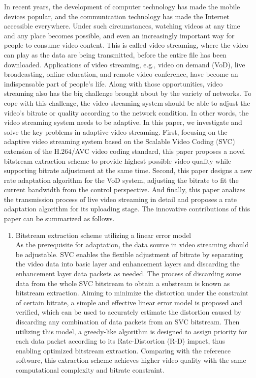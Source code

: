 \begin{eabstract}
In recent years, the development of computer technology has made the mobile devices popular, and the communication technology has made the Internet accessible everywhere. Under such circumstances, watching videos at any time and any place becomes possible, and even an increasingly important way for people to consume video content. This is called video streaming, where the video can play as the data are being transmitted, before the entire file has been downloaded. Applications of video streaming, e.g., video on demand (VoD), live broadcasting, online education, and remote video conference, have become an indispensable part of people's life. Along with those opportunities, video streaming also has the big challenge brought about by the variety of networks. To cope with this challenge, the video streaming system should be able to adjust the video's bitrate or quality according to the network condition. In other words, the video streaming system needs to be adaptive. In this paper, we investigate and solve the key problems in adaptive video streaming. First, focusing on the adaptive video streaming system based on the Scalable Video Coding (SVC) extension of the H.264/AVC video coding standard, this paper proposes a novel bitstream extraction scheme to provide highest possible video quality while supporting bitrate adjustment at the same time. Second, this paper designs a new rate adaptation algorithm for the VoD system, adjusting the bitrate to fit the current bandwidth from the control perspective. And finally, this paper analizes the transmission process of live video streaming in detail and proposes a rate adaptation algorithm for its uploading stage. The innovative contributions of this paper can be summarized as follows.
\begin{enumerate}
\item {Bitstream extraction scheme utilizing a linear error model}\\
As the prerequisite for adaptation, the data source in video streaming should be adjustable. SVC enables the flexible adjustment of bitrate by separating the video data into basic layer and enhancement layers and discarding the enhancement layer data packets as needed. The process of discarding some data from the whole SVC bitstream to obtain a substream is known as bitstream extraction. Aiming to minimize the distortion under the constraint of certain bitrate, a simple and effective linear error model is proposed and verified, which can be used to accurately estimate the distortion caused by discarding any combination of data packets from an SVC bitstream. Then utilizing this model, a greedy-like algorithm is designed to assign priority for each data packet according to its Rate-Distortion (R-D) impact, thus enabling optimized bitstream extraction. Comparing with the reference software, this extraction scheme achieves higher video quality with the same computational complexity and bitrate constraint.

\end{enumerate}
\end{eabstract}
